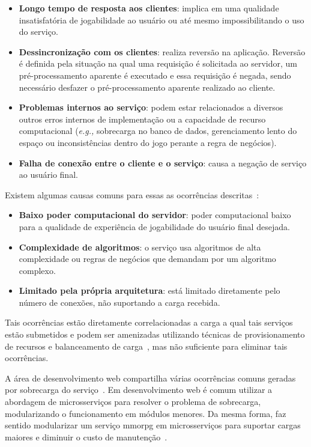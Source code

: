 \begin{itemize}
  \item \textbf{Longo tempo de resposta aos clientes}: implica em uma qualidade insatisfatória de jogabilidade ao usuário ou até mesmo impossibilitando o uso do serviço.
  \item \textbf{Dessincronização com os clientes}: realiza reversão na aplicação. Reversão é definida pela situação na qual uma requisição é solicitada ao servidor, um pré-processamento aparente é executado e essa requisição é negada, sendo necessário desfazer o pré-processamento aparente realizado ao cliente.
  \item \textbf{Problemas internos ao serviço}:  podem estar relacionados a diversos outros erros internos de implementação ou a capacidade de recurso computacional (\textit{e.g.,} sobrecarga no banco de dados, gerenciamento lento do espaço ou inconsistências dentro do jogo perante a regra de negócios).
  \item \textbf{Falha de conexão entre o cliente e o serviço}: causa a negação de serviço ao usuário final.
\end{itemize}

Existem algumas causas comuns para essas as ocorrências descritas~\cite{1417630}:

\begin{itemize}
  \item \textbf{Baixo poder computacional do servidor}: poder computacional baixo para a qualidade de experiência de jogabilidade do usuário final desejada.
  \item \textbf{Complexidade de algoritmos}: o serviço usa algoritmos de alta complexidade ou regras de negócios que demandam por um algoritmo complexo.
  \item \textbf{Limitado pela própria arquitetura}: está limitado diretamente pelo número de conexões, não suportando a carga recebida.
\end{itemize}

Tais ocorrências estão diretamente correlacionadas a carga a qual tais serviços estão submetidos e podem ser amenizadas utilizando técnicas de provisionamento de recursos e balanceamento de carga~\cite{1417630}, mas não suficiente para eliminar tais ocorrências.

A área de desenvolvimento web compartilha várias ocorrências comuns geradas por sobrecarga do serviço~\cite{7830692}.
%
Em desenvolvimento web é comum utilizar a abordagem de microsserviços para resolver o problema de sobrecarga, modularizando o  funcionamento em módulos menores.
%
Da mesma forma, faz sentido modularizar um serviço \ac{mmorpg} em microsserviços para suportar cargas maiores e diminuir o custo de manutenção~\cite{7515686}.


